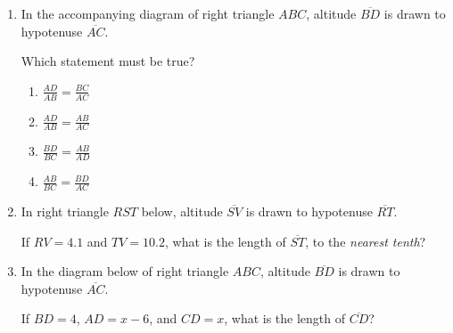 \documentclass[12pt, oneside]{article}
\begin{document}
\begin{enumerate}[itemsep=0cm]
\item In the accompanying diagram of right triangle $ABC$, altitude $\overline{BD}$ is drawn to hypotenuse $\overline{AC}$.
  \begin{center}
  \end{center}
  Which statement must be true?
  \begin{multicols}{2}
    \begin{enumerate}
      \item $\displaystyle \frac{AD}{AB} = \frac{BC}{AC}$
      \item $\displaystyle \frac{AD}{AB} = \frac{AB}{AC}$ 
      \item $\displaystyle \frac{BD}{BC} = \frac{AB}{AD}$
      \item $\displaystyle \frac{AB}{BC} = \frac{BD}{AC}$
    \end{enumerate}
  \end{multicols}

\newpage
\item In right triangle $RST$ below, altitude $\overline{SV}$ is drawn to hypotenuse $\overline{RT}$.
  \begin{center}
  \end{center}
If $RV=4.1$ and $TV=10.2$, what is the length of $\overline{ST}$, to the \emph{nearest tenth}?

\item In the diagram below of right triangle $ABC$, altitude $\overline{BD}$ is drawn to hypotenuse $\overline{AC}$.
  \begin{center}
  \end{center}
If $BD=4$, $AD=x-6$, and $CD=x$, what is the length of $\overline{CD}$?


\end{enumerate}
\end{document}
